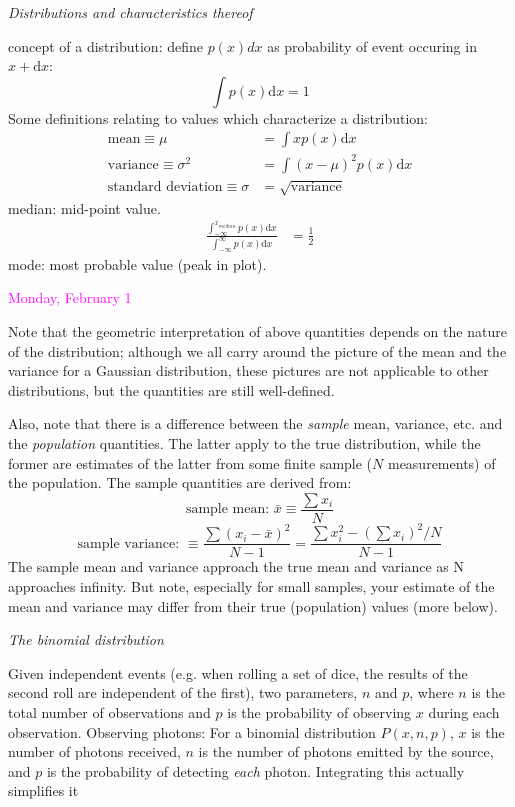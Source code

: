 \documentclass[12pt]{article}
\begin{document}
\emph{Distributions and characteristics thereof}

concept of a distribution: define $p(x)dx$ as probability of
event occuring in $x + \textrm{d}x$:
        $$ \int p(x)\textrm{d}x = 1 $$
Some definitions relating to values which characterize a distribution:
\begin{align*}
    \textrm{mean} \equiv \mu &= \int xp(x)\textrm{d}x \\
    \textrm{variance} \equiv \sigma^2 &= \int (x-\mu)^2 p(x)\textrm{d}x \\
    \textrm{standard\ deviation} \equiv \sigma &= \sqrt{\textrm{variance}}
\end{align*}
median: mid-point value.
\begin{align*}
    \frac{ \int_{-\infty}^{x_{median}} p(x)\textrm{d}x }
    { \int_{-\infty}^{\infty} p(x)\textrm{d}x }
    &= \frac{1}{2}
\end{align*}
mode: most probable value (peak in plot).

\textcolor{magenta}{Monday, February 1}

Note that the geometric interpretation of above quantities
depends on the nature of the distribution; although we all carry
around the picture of the mean and the variance for a Gaussian
distribution, these pictures are not applicable to other
distributions, but the quantities are still well-defined.

Also, note that there is a difference between the
\emph{sample}
mean, variance, etc. and the \emph{population} quantities. The latter apply
to the true distribution, while the former are estimates of the latter
from some finite sample ($N$ measurements) of the population. The sample
quantities are derived from:
$$\textrm{sample\ mean:\ } \bar{x} \equiv \frac{\sum x_i}{N}$$
$$\textrm{sample\ variance:\ } \equiv
  \frac{\sum (x_i-\bar{x})^2}{N-1} =
  \frac{\sum x_i^2-(\sum x_i)^2/N}{N-1}$$
The sample mean and variance approach the true mean and variance as N
approaches infinity. But note, especially for small samples, your
estimate of the mean and variance may differ from their true
(population) values (more below).

\emph{The binomial distribution}

\textcolor{myBlue}{Given independent events (e.g. when rolling a set
of dice, the results of the second roll are independent of the first),
two parameters, $n$ and $p$, where $n$
is the total number of observations and $p$ is the probability of
observing $x$ during each observation. 
Observing photons:
For a binomial distribution $P(x,n,p)$, $x$ is the number of photons
received, $n$ is the number of
photons emitted by the source, and $p$ is the probability of detecting
\emph{each} photon. Integrating this actually simplifies it}
\end{document}
